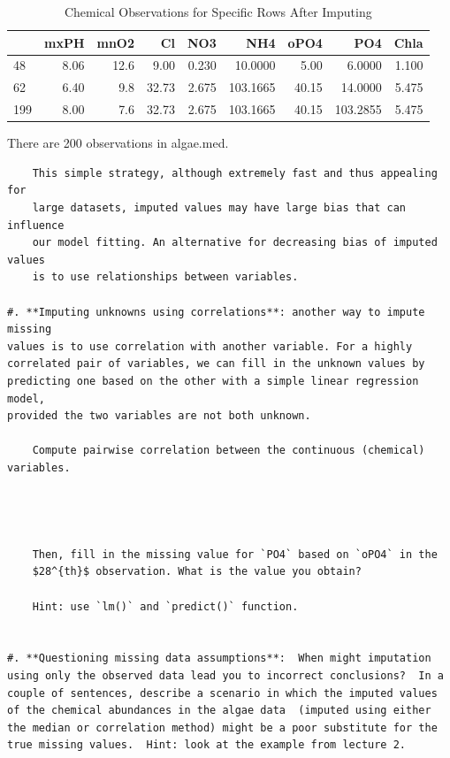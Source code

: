 \documentclass[]{article}
\begin{document}
\begin{table}

\caption{\label{tab:unnamed-chunk-5}Chemical Observations for Specific Rows After Imputing}
\centering
\begin{tabular}[t]{lrrrrrrrr}
\toprule
  & mxPH & mnO2 & Cl & NO3 & NH4 & oPO4 & PO4 & Chla\\
\midrule
48 & 8.06 & 12.6 & 9.00 & 0.230 & 10.0000 & 5.00 & 6.0000 & 1.100\\
62 & 6.40 & 9.8 & 32.73 & 2.675 & 103.1665 & 40.15 & 14.0000 & 5.475\\
199 & 8.00 & 7.6 & 32.73 & 2.675 & 103.1665 & 40.15 & 103.2855 & 5.475\\
\bottomrule
\end{tabular}
\end{table}

There are 200 observations in algae.med.

\begin{verbatim}
    This simple strategy, although extremely fast and thus appealing for
    large datasets, imputed values may have large bias that can influence
    our model fitting. An alternative for decreasing bias of imputed values
    is to use relationships between variables.
    
#. **Imputing unknowns using correlations**: another way to impute missing
values is to use correlation with another variable. For a highly
correlated pair of variables, we can fill in the unknown values by
predicting one based on the other with a simple linear regression model,
provided the two variables are not both unknown. 

    Compute pairwise correlation between the continuous (chemical) variables. 




    Then, fill in the missing value for `PO4` based on `oPO4` in the
    $28^{th}$ observation. What is the value you obtain? 
    
    Hint: use `lm()` and `predict()` function.


#. **Questioning missing data assumptions**:  When might imputation using only the observed data lead you to incorrect conclusions?  In a couple of sentences, describe a scenario in which the imputed values of the chemical abundances in the algae data  (imputed using either the median or correlation method) might be a poor substitute for the true missing values.  Hint: look at the example from lecture 2.  
\end{verbatim}
\end{document}
